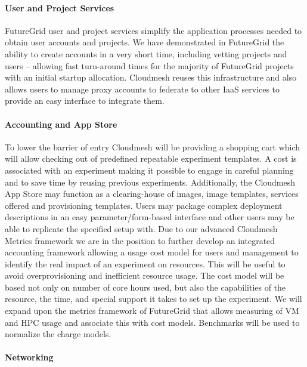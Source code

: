 \documentclass{tex/sig-alternate-2013}
\begin{document}
\paragraph{User and Project Services}


FutureGrid user and project services simplify the application processes needed to obtain user accounts and projects. We have demonstrated in FutureGrid the ability to create accounts in a very short time, including vetting projects and users -- allowing fast turn-around times for the majority of FutureGrid projects with an initial startup allocation. Cloudmesh reuses this infrastructure and also allows users to manage proxy accounts to federate to other IaaS services to provide an easy interface to integrate them.


\paragraph{Accounting and App Store}


To lower the barrier of entry Cloudmesh will be providing a shopping cart which will allow checking out of predefined repeatable experiment templates. A cost is associated with an experiment making it possible to engage in careful planning and to save time by reusing previous experiments. Additionally, the Cloudmesh App Store may function as a clearing-house of images, image templates, services offered and provisioning templates. Users may package complex deployment descriptions in an easy parameter/form-based interface and other users may be able to replicate the specified setup with.
Due to our advanced Cloudmesh Metrics framework we are in the position to further develop an integrated accounting framework allowing a usage cost model for users and management to identify the real impact of an experiment on resources. This will be useful to avoid overprovisioning and inefficient resource usage. The cost model will be based not only on number of core hours used, but also the capabilities of the resource, the time, and special support it takes to set up the experiment. We will expand upon the metrics framework of FutureGrid that allows measuring of VM and HPC usage and associate this with cost models. Benchmarks will be used to normalize the charge models.


\paragraph{Networking}
\end{document}
